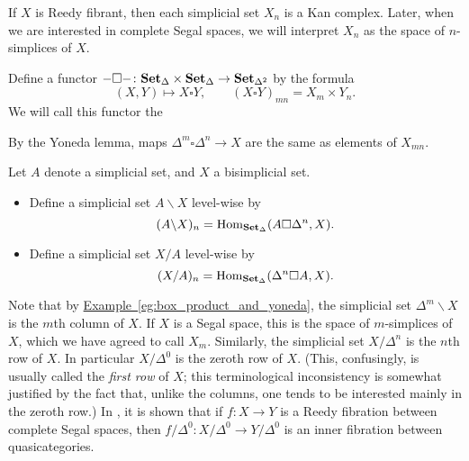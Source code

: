 \documentclass[main.tex]{subfiles}
\begin{document}
If $X$ is Reedy fibrant, then each simplicial set $X_{n}$ is a Kan complex. Later, when we are interested in complete Segal spaces, we will interpret $X_{n}$ as the space of $n$-simplices of $X$.

\begin{definition}
  Define a functor $- \square -\colon \mathbf{Set}_{\Delta} \times \mathbf{Set}_{\Delta} \to \mathbf{Set}_{\Delta^{2}}$ by the formula
  \begin{equation*}
    (X, Y) \mapsto X \square Y,\qquad (X \square Y)_{mn} = X_{m} \times Y_{n}.
  \end{equation*}
  We will call this functor the 
\end{definition}

\begin{example}
  \label{eg:box_product_and_yoneda}
  By the Yoneda lemma, maps $\Delta^{m} \square \Delta^{n} \to X$ are the same as elements of $X_{mn}$.
\end{example}

\begin{definition}
  \label{def:left_and_right_divison_functors}
  Let $A$ denote a simplicial set, and $X$ a bisimplicial set.
  \begin{itemize}
    \item Define a simplicial set $A \backslash X$ level-wise by
      \begin{equation*}
        (A \backslash X)_{n} = \mathrm{Hom}_{\mathbf{Set}_{\Delta}}(A \square \Delta^{n}, X).
      \end{equation*}

    \item Define a simplicial set $X / A$ level-wise by
      \begin{equation*}
        (X / A)_{n} = \mathrm{Hom}_{\mathbf{Set}_{\Delta}}(\Delta^{n} \square A, X).
      \end{equation*}
  \end{itemize}
\end{definition}

Note that by \hyperref[eg:box_product_and_yoneda]{Example~\ref*{eg:box_product_and_yoneda}}, the simplicial set $\Delta^{m} \backslash X$ is the $m$th column of $X$. If $X$ is a Segal space, this is the space of $m$-simplices of $X$, which we have agreed to call $X_{m}$. Similarly, the simplicial set $X / \Delta^{n}$ is the $n$th row of $X$. In particular $X / \Delta^{0}$ is the zeroth row of $X$. (This, confusingly, is usually called the \emph{first row} of $X$; this terminological inconsistency is somewhat justified by the fact that, unlike the columns, one tends to be interested mainly in the zeroth row.) In \cite{qcats_vs_segal_spaces}, it is shown that if $f\colon X \to Y$ is a Reedy fibration between complete Segal spaces, then $f / \Delta^{0}\colon X / \Delta^{0} \to Y / \Delta^{0}$ is an inner fibration between quasicategories.
\end{document}
